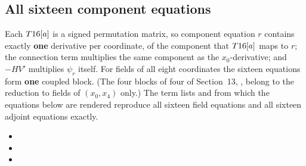 \subsection{All sixteen component equations}
\label{sec:5.4}

Each $T16[a]$ is a signed permutation matrix, so component equation $r$ contains exactly
\textbf{one} derivative per coordinate, of the component that $T16[a]$ maps to $r$; the connection
term multiplies the same component as the $x_0$-derivative; and $-HV'$ multiplies $\psi_r$ itself.
For fields of all eight coordinates the sixteen equations form \textbf{one} coupled block. (The four
blocks of four of Section~13, , belong to the reduction to fields of $(x_0,x_4)$
only.) The term lists  and  from which the equations
below are rendered reproduce all sixteen field equations and all sixteen adjoint equations exactly.
\begin{itemize}
  \item {}
  \item {}
  \item {}
\end{itemize}

